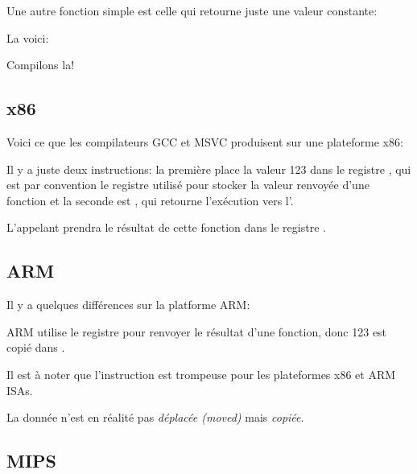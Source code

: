 ﻿
\label{ret_val_func}

Une autre fonction simple est celle qui retourne juste une valeur constante:

La voici:



Compilons la!

\subsection{x86}

Voici ce que les compilateurs GCC et MSVC produisent sur une plateforme x86:



Il y a juste deux instructions: la première place la valeur 123 dans le registre \EAX, qui est par convention le registre utilisé pour stocker la valeur renvoyée d'une fonction et la seconde est \RET, qui retourne l'exécution vers l'.

L'appelant prendra le résultat de cette fonction dans le registre \EAX.

\subsection{ARM}

Il y a quelques différences sur la platforme ARM:



ARM utilise le registre  pour renvoyer le résultat d'une fonction, donc 123 est copié dans .


Il est à noter que l'instruction \MOV est trompeuse pour les plateformes x86 et ARM \ac{ISA}s.

La donnée n'est en réalité pas \emph{déplacée (moved)} mais \emph{copiée}.

\subsection{MIPS}

\label{MIPS_leaf_function_ex1}


